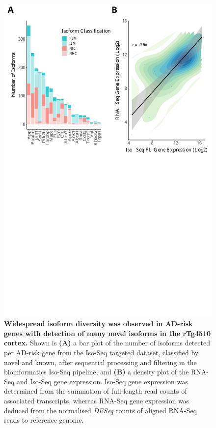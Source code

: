\begin{figure}[!htp]
	\begin{center}
		\includegraphics[page=1,trim={0 20cm 0 0cm},clip,scale = 0.60]{Figures/ONTvsIsoSeq.pdf}
	\end{center}
	\captionsetup{width=0.95\textwidth}
	\caption[Isoform landscape of AD-risk genes from Iso-Seq targeted profiling]%
	{\textbf{Widespread isoform diversity was observed in AD-risk genes with detection of many novel isoforms in the rTg4510 cortex.} Shown is \textbf{(A)} a bar plot of the number of isoforms detected per AD-risk gene from the Iso-Seq targeted dataset, classified by novel and known, after sequential processing and filtering in the bioinformatics Iso-Seq pipeline, and \textbf{(B)} a density plot of the RNA-Seq and Iso-Seq gene expression. Iso-Seq gene expression was determined from the summation of full-length read counts of associated transcripts, whereas RNA-Seq gene expression was deduced from the normalised \textit{DESeq} counts of aligned RNA-Seq reads to reference genome\cite{Castanho2020}.}
	\label{fig:isoseq_targeted_finalnumberiso}
\end{figure}

